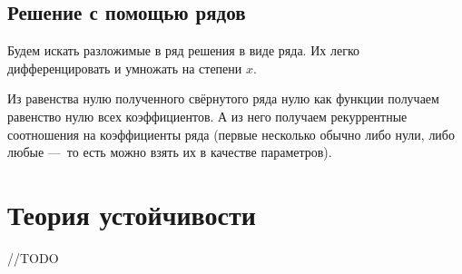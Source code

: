 \documentclass[12pt, a4paper]{article}
\begin{document}
\subsection{Решение с помощью рядов}

Будем искать разложимые в ряд решения в виде ряда.
Их легко дифференцировать и умножать на степени $x$.

Из равенства нулю полученного свёрнутого ряда нулю как функции 
получаем равенство нулю всех коэффициентов. 
А из него получаем рекуррентные соотношения на коэффициенты ряда 
(первые несколько обычно либо нули, 
либо любые — то есть можно взять их в качестве параметров).

\section{Теория устойчивости}

//TODO
\end{document}
